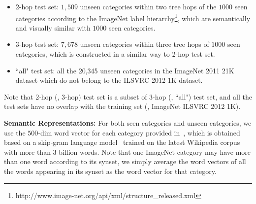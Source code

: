 \documentclass[journal]{IEEEtran}
\begin{document}
\begin{itemize}
\item 2-hop test set: $1,509$ unseen categories within
two tree hops of the $1000$ seen categories according to
the ImageNet label hierarchy\footnote{http://www.image-net.org/api/xml/structure\_released.xml}, which are semantically and visually similar with $1000$ seen categories.
\item 3-hop test set: $7,678$ unseen categories within three tree hops of $1000$ seen categories, which is constructed in a similar way to 2-hop test set.
\item ``all" test set: all the 20,345 unseen categories in the ImageNet 2011 21K dataset which do not belong to the ILSVRC 2012 1K dataset.
\end{itemize}

Note that 2-hop (\resp, 3-hop) test set is a subset of 3-hop (\resp, ``all") test set, and all the test sets have no overlap with the training set (\eg, ImageNet ILSVRC 2012 1K).

\noindent\textbf{Semantic Representations:}
For both seen categories and unseen categories, we use the  $500$-dim word vector for each category provided in~\cite{changpinyo2016synthesized}, which is obtained based on a skip-gram language model~\cite{mikolov2013distributed} trained on the latest Wikipedia corpus with more than 3 billion words. Note that one ImageNet category may have more than one word according to its synset, we simply average the word vectors of all the words appearing in its synset as the word vector for that category.
\end{document}
